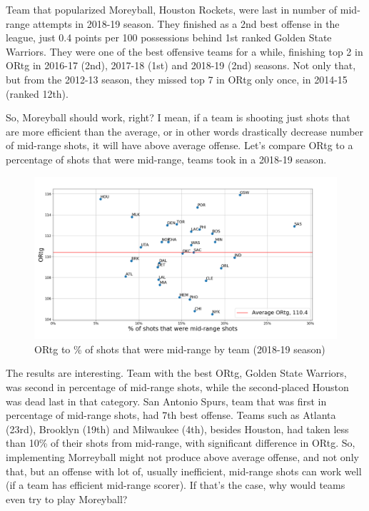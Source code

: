 \documentclass[a4paper]{article}
\begin{document}
Team that popularized Moreyball, Houston Rockets, were last in number of mid-range attempts in 2018-19 season. They finished as a 2nd best offense in the league, just 0.4 points per 100 possessions behind 1st ranked Golden State Warriors. They were one of the best offensive teams for a while, finishing top 2 in ORtg in 2016-17 (2nd), 2017-18 (1st) and 2018-19 (2nd) seasons. Not only that, but from the 2012-13 season, they missed top 7 in ORtg only once, in 2014-15 (ranked 12th).

So, Moreyball should work, right? I mean, if a team is shooting just shots that are more efficient than the average, or in other words drastically decrease number of mid-range shots, it will have above average offense. Let's compare ORtg to a percentage of shots that were mid-range, teams took in a 2018-19 season.

\begin{figure}[h!]
\begin{center}
\includegraphics[scale=0.29]{ortg_pct_mid_range.png}
\end{center}
\caption{ORtg to \% of shots that were mid-range by team (2018-19 season)}
\label{plt:ortg_oct_mid_range}
\end{figure}

The results are interesting. Team with the best ORtg, Golden State Warriors, was second in percentage of mid-range shots, while the second-placed Houston was dead last in that category. San Antonio Spurs, team that was first in percentage of mid-range shots, had 7th best offense. Teams such as Atlanta (23rd), Brooklyn (19th) and Milwaukee (4th), besides Houston, had taken less than 10\% of their shots from mid-range, with significant difference in ORtg. So, implementing Morreyball might not produce above average offense, and not only that, but an offense with lot of, usually inefficient, mid-range shots can work well (if a team has efficient mid-range scorer). If that's the case, why would teams even try to play Moreyball?
\end{document}
